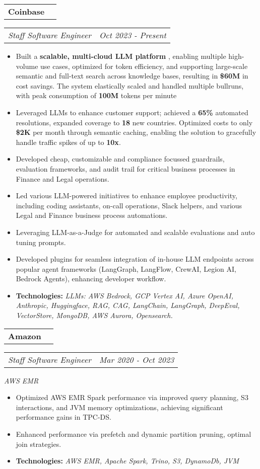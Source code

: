 \documentclass[a4paper,11pt]{article}
\makeatletter
\newcommand{\resitem}[1]{\item #1}
\newcommand{\resCompany}[1]{
    \begin{tabular*}{\textwidth}{l @{\extracolsep{\fill}} r}
    \large \textbf{#1}
  \end{tabular*}
}
\newcommand{\resPosition}[2]{
    \begin{tabular*}{\textwidth}{l @{\extracolsep{\fill}} r}
        \textit{#1} & \textit{#2}
    \end{tabular*}
}
\makeatother
\begin{document}
    
    \indent \resCompany{Coinbase}
        \indent \resPosition{Staff Software Engineer}{Oct 2023 - Present}
        \begin{itemize}[leftmargin=30pt, rightmargin=-16pt, itemsep=-2pt]
            \resitem{Built a \textbf{scalable, multi-cloud LLM platform} , enabling multiple high-volume use cases, optimized for token efficiency, and supporting large-scale semantic and full-text search across knowledge bases, resulting in \textbf{\$60M} in cost savings. The system elastically scaled and handled multiple bullruns, with peak consumption of \textbf{100M} tokens per minute}

            \resitem{Leveraged LLMs to enhance customer support; achieved a \textbf{65\%} automated resolutions, expanded coverage to \textbf{18} new countries. Optimized costs to only \textbf{\$2K} per month through semantic caching, enabling the solution to gracefully handle traffic spikes of up to \textbf{10x}.}
            
            \resitem{Developed cheap, customizable and compliance focussed guardrails, evaluation frameworks, and audit trail for critical business processes in Finance and Legal operations.}  
        
            \resitem{Led various LLM-powered initiatives to enhance employee productivity, including coding assistants, on-call operations, Slack helpers, and various Legal and Finance business process automations.}

            \resitem{Leveraging LLM-as-a-Judge for automated and scalable evaluations and auto tuning prompts.}

            \resitem{Developed plugins for seamless integration of in-house LLM endpoints across popular agent frameworks (LangGraph, LangFlow, CrewAI, Legion AI, Bedrock Agents), enhancing developer workflow.}
        
            \resitem{\textbf{Technologies:} \textit{LLMs: AWS Bedrock, GCP Vertex AI, Azure OpenAI, Anthropic, Huggingface, RAG, CAG, LangChain, LangGraph, DeepEval, VectorStore, MongoDB, AWS Aurora, Opensearch.}}
            
        \end{itemize}


    \indent \resCompany{Amazon}
        \indent \resPosition{Staff Software Engineer}{Mar 2020 - Oct 2023}
        \indent \textit{AWS EMR}
        \begin{itemize}[leftmargin=30pt, rightmargin=-16pt, itemsep=-2pt]
            \setlength{\itemsep}{-3pt}
            
            \resitem{Optimized AWS EMR Spark performance via improved query planning, S3 interactions, and JVM memory optimizations, achieving significant performance gains in TPC-DS.}
            
            \resitem{Enhanced performance via prefetch and dynamic partition pruning, optimal join strategies.}

            \resitem{\textbf{Technologies:} \textit{AWS EMR, Apache Spark, Trino, S3, DynamoDb, JVM}}
            
        \end{itemize}
\end{document}
